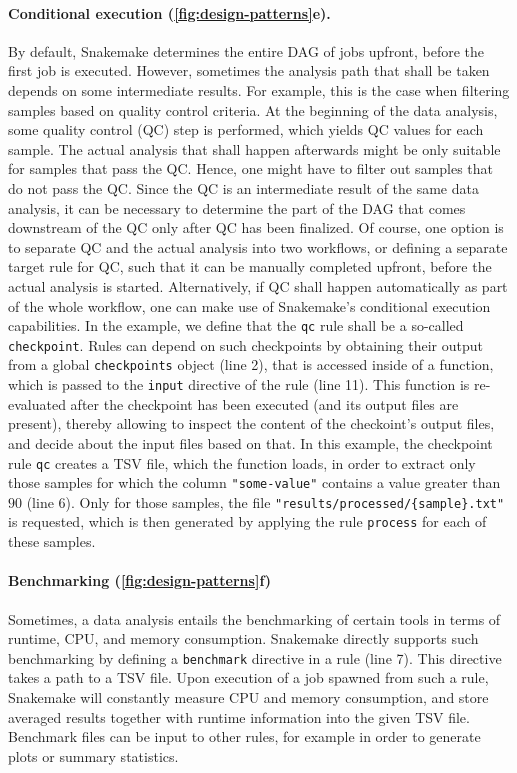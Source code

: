 \documentclass{scrartcl}
\begin{document}
\paragraph{Conditional execution (\autoref{fig:design-patterns}e).}
By default, Snakemake determines the entire DAG of jobs upfront, before the first job is executed.
However, sometimes the analysis path that shall be taken depends on some intermediate results.
For example, this is the case when filtering samples based on quality control criteria.
At the beginning of the data analysis, some quality control (QC) step is performed, which yields QC values for each sample.
The actual analysis that shall happen afterwards might be only suitable for samples that pass the QC.
Hence, one might have to filter out samples that do not pass the QC.
Since the QC is an intermediate result of the same data analysis, it can be necessary to determine the part of the DAG that comes downstream of the QC only after QC has been finalized.
Of course, one option is to separate QC and the actual analysis into two workflows, or defining a separate target rule for QC, such that it can be manually completed upfront, before the actual analysis is started.
Alternatively, if QC shall happen automatically as part of the whole workflow, one can make use of Snakemake's conditional execution capabilities.
In the example, we define that the \lstinline!qc! rule shall be a so-called \lstinline!checkpoint!.
Rules can depend on such checkpoints by obtaining their output from a global \lstinline!checkpoints! object (line 2), that is accessed inside of a function, which is passed to the \lstinline!input! directive of the rule (line 11).
This function is re-evaluated after the checkpoint has been executed (and its output files are present), thereby allowing to inspect the content of the checkoint's output files, and decide about the input files based on that.
In this example, the checkpoint rule \lstinline!qc! creates a TSV file, which the function loads, in order to extract only those samples for which the column \lstinline!"some-value"! contains a value greater than $90$ (line 6).
Only for those samples, the file \lstinline!"results/processed/{sample}.txt"! is requested, which is then generated by applying the rule \lstinline!process! for each of these samples.

\paragraph{Benchmarking (\autoref{fig:design-patterns}f)}
Sometimes, a data analysis entails the benchmarking of certain tools in terms of runtime, CPU, and memory consumption.
Snakemake directly supports such benchmarking by defining a \lstinline!benchmark! directive in a rule (line 7).
This directive takes a path to a TSV file.
Upon execution of a job spawned from such a rule, Snakemake will constantly measure CPU and memory consumption, and store averaged results together with runtime information into the given TSV file.
Benchmark files can be input to other rules, for example in order to generate plots or summary statistics.
\end{document}
